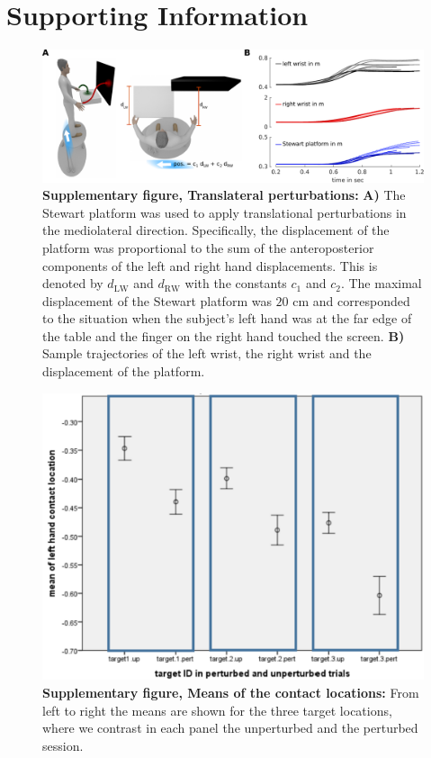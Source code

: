 
\section{Supporting Information}

\begin{figure}
\centering
\includegraphics[width=\textwidth]{Elmar/picsSupp/SubFigStewartPert}
 \caption{\textbf{Supplementary figure, Translateral perturbations:} 
 \textbf{A)} The Stewart platform was used to apply translational perturbations in the mediolateral direction. Specifically, the displacement of the platform was proportional to the sum of the anteroposterior components of the left and right hand displacements. This is denoted by $d_{\textrm{LW}}$ and $d_{\textrm{RW}}$ with the constants $c_1$ and $c_2$. The maximal displacement of the Stewart platform was $20$ cm and corresponded to the situation when the subject's left hand was at the far edge of the table and the finger on the right hand touched the screen. \textbf{B)} Sample trajectories of the left wrist, the right wrist and the displacement of the platform. 
 }
\label{fig:SubFigStewartPert}
\end{figure}


\begin{figure}
\centering
\includegraphics[width=.7\textwidth]{Elmar/picsSupp/SubFigANOVAContactsUPvsPNoTitle}
 \caption{\textbf{Supplementary figure, Means of the contact locations:} 
 From left to right the means are shown for the three target locations, where we contrast in each panel the unperturbed and the perturbed session.  
 }
\label{fig:SubFigANOVAContacts}
\end{figure}



